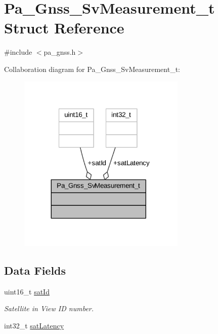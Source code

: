 \hypertarget{struct_pa___gnss___sv_measurement__t}{}\section{Pa\+\_\+\+Gnss\+\_\+\+Sv\+Measurement\+\_\+t Struct Reference}
\label{struct_pa___gnss___sv_measurement__t}


{\ttfamily \#include $<$pa\+\_\+gnss.\+h$>$}



Collaboration diagram for Pa\+\_\+\+Gnss\+\_\+\+Sv\+Measurement\+\_\+t\+:
\nopagebreak
\begin{figure}[H]
\begin{center}
\leavevmode
\includegraphics[width=227pt]{struct_pa___gnss___sv_measurement__t__coll__graph}
\end{center}
\end{figure}
\subsection*{Data Fields}
\begin{DoxyCompactItemize}
\item 
uint16\+\_\+t \hyperlink{struct_pa___gnss___sv_measurement__t_a3e21c003064c204efcf3efc2a3238f02}{sat\+Id}
\begin{DoxyCompactList}\small\item\em Satellite in View ID number. \end{DoxyCompactList}\item 
int32\+\_\+t \hyperlink{struct_pa___gnss___sv_measurement__t_ac2bc09238dff84fe6f7fe8aa51fc25a7}{sat\+Latency}
\end{DoxyCompactItemize}


